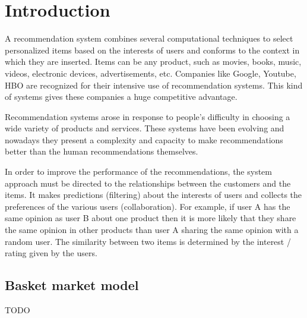 \section{Introduction}
\label{intro}

A recommendation system combines several computational techniques to select personalized items based on the
interests of users and conforms to the context in which they are inserted.
Items can be any product, such as movies, books, music, videos, electronic devices, advertisements, etc.
Companies like Google, Youtube, HBO are recognized for their intensive use of recommendation systems.
This kind of systems gives these companies a huge competitive advantage.

Recommendation systems arose in response to people's difficulty in choosing a wide variety of products and services.
These systems have been evolving and nowadays they present a complexity and capacity to make recommendations better
than the human recommendations themselves.

In order to improve the performance of the recommendations, the system approach must be directed to the relationships
between the customers and the items. 
It makes predictions (filtering) about the interests of users and collects the preferences of the various users (collaboration).
For example, if user A has the same opinion as user B about one product then it is more likely that they share
the same opinion in other products than user A sharing the same opinion with a random user.
The similarity between two items is determined by the interest / rating given by the users.

\subsection{Basket market model}




TODO